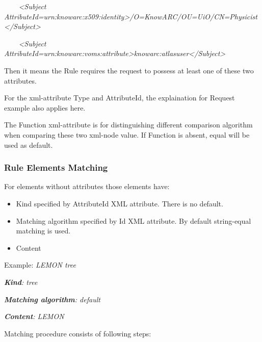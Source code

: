 \documentclass{article}
\newcommand\liststyleWWviiiNumxxii{%
\renewcommand\theenumi{\arabic{enumi}}
\renewcommand\theenumii{\arabic{enumii}}
\renewcommand\theenumiii{\arabic{enumiii}}
\renewcommand\labelitemi{o}
\renewcommand\labelenumi{\theenumi.}
\renewcommand\labelenumii{\theenumii.}
\renewcommand\labelenumiii{\theenumiii.}
}
\begin{document}
{\color{black}
\textit{\ \ \ \ }\textit{{\textless}Subject
AttributeId={\textquotedbl}urn:knowarc:x509:identity{\textquotedbl}{\textgreater}/O=KnowARC/OU=UiO/CN=Physicist{\textless}/Subject{\textgreater}}}

{\color{black}
\textit{\ \ \ \ }\textit{{\textless}Subject
AttributeId={\textquotedbl}urn:knowarc:voms:attribute{\textgreater}knowarc:atlasuser{\textless}/Subject{\textgreater}}}

{\upshape\color{black}
Then it means the Rule requires the request to possess at least one of
these two attributes.}

{\color{black}
For the xml-attribute {\textquotedbl}Type{\textquotedbl} and
{\textquotedbl}AttributeId{\textquotedbl}, the explaination for Request
example also applies here.}

{\color{black}
The {\textquotedbl}Function{\textquotedbl} xml-attribute is for
distinguishing different comparison algorithm when comparing these two
xml-node value. If Function is absent,
{\textquotedbl}equal{\textquotedbl} will be used as default.}

\subsubsection{Rule Elements Matching}
{\color{black}
For elements without attributes those elements have:}

\liststyleWWviiiNumxxii
\begin{itemize}
\item {\color{black}
Kind specified by AttributeId XML attribute. There is no default.}
\item {\color{black}
Matching algorithm specified by Id XML attribute. By default
string-equal matching is used.}
\item {\color{black}
Content}
\end{itemize}
{\upshape\color{black}
Example: \textit{LEMON tree}}

{\upshape\color{black}
\textbf{\textit{Kind}}\textit{: tree}}

{\upshape\color{black}
\textbf{\textit{Matching algorithm}}\textit{: default}}

{\upshape\color{black}
\textbf{\textit{Content}}\textit{: LEMON}}

{\color{black}
Matching procedure consists of following steps:}
\end{document}
